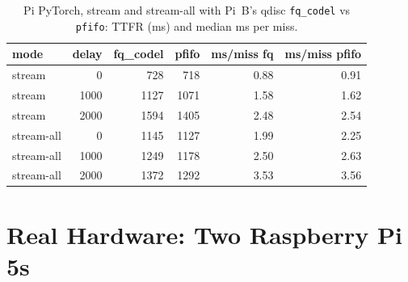 \documentclass[conference]{IEEEtran}
\newcommand{\mode}[1]{\textsf{#1}}
\begin{document}
\begin{table}[t]
\centering
\caption{Pi PyTorch, \mode{stream} and \mode{stream-all} with Pi~B's qdisc
\texttt{fq\_codel} vs \texttt{pfifo}: TTFR (ms) and median ms per miss.}
\label{tab:pfifo}
\setlength{\tabcolsep}{4pt}
\begin{tabular}{@{}lrrrrr@{}}
\toprule
mode & delay & fq\_codel & pfifo & ms/miss fq & ms/miss pfifo \\
\midrule
stream     & 0    & 728  & 718  & 0.88 & 0.91 \\
stream     & 1000 & 1127 & 1071 & 1.58 & 1.62 \\
stream     & 2000 & 1594 & 1405 & 2.48 & 2.54 \\
stream-all & 0    & 1145 & 1127 & 1.99 & 2.25 \\
stream-all & 1000 & 1249 & 1178 & 2.50 & 2.63 \\
stream-all & 2000 & 1372 & 1292 & 3.53 & 3.56 \\
\bottomrule
\end{tabular}
\end{table}

\section{Real Hardware: Two Raspberry Pi 5s}
\label{sec:pi}
\end{document}
